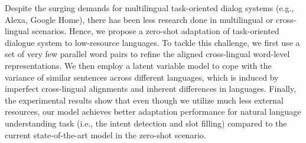 Despite the surging demands for multilingual task-oriented dialog systems (e.g., Alexa, Google Home), there has been less research done in multilingual or cross-lingual scenarios.  Hence, we propose a zero-shot adaptation of task-oriented dialogue system to low-resource languages. To tackle this challenge, we first use a set of very few parallel word pairs to refine the aligned cross-lingual word-level representations. We then employ a latent variable model to cope with the variance of similar sentences across different languages, which is induced by imperfect cross-lingual alignments and inherent differences in languages. Finally, the experimental results show that even though we utilize much less external resources, our model achieves better adaptation performance for natural language understanding task (i.e., the intent detection and slot filling) compared to the current state-of-the-art model in the zero-shot scenario.